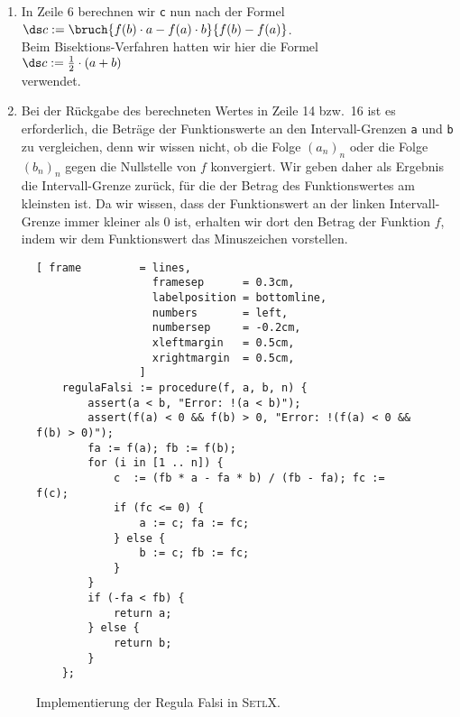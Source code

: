 \begin{enumerate}
\item In Zeile 6 berechnen wir \texttt{c} nun nach der Formel
      \\[0.2cm]
      \hspace*{1.3cm}
      $\ds c := \bruch{f(b) \cdot a - f(a) \cdot b}{f(b) - f(a)}$. 
      \\[0.2cm]
      Beim Bisektions-Verfahren hatten wir hier die Formel
      \\[0.2cm]
      \hspace*{1.3cm}
      $\ds c := \frac{1}{2} \cdot (a + b)$
      \\[0.2cm]
      verwendet.
\item Bei der R\"uckgabe des berechneten Wertes in Zeile 14 bzw.~16 ist es erforderlich, die Betr\"age der
      Funktionswerte an den Intervall-Grenzen  \texttt{a} und \texttt{b} zu vergleichen, denn wir
      wissen nicht, ob die Folge $(a_n)_n$ oder die Folge $(b_n)_n$ gegen die Nullstelle von $f$
      konvergiert.  Wir geben daher als Ergebnis die 
      Intervall-Grenze  zur\"uck, f\"ur die der Betrag des Funktionswertes am kleinsten ist.
      Da wir wissen, dass der Funktionswert an der linken Intervall-Grenze immer kleiner als 0
      ist, erhalten wir dort den Betrag der Funktion $f$, indem wir dem Funktionswert das Minuszeichen
      vorstellen. 
\end{enumerate}

\begin{figure}[!ht]
  \centering
\begin{Verbatim}[ frame         = lines, 
                  framesep      = 0.3cm, 
                  labelposition = bottomline,
                  numbers       = left,
                  numbersep     = -0.2cm,
                  xleftmargin   = 0.5cm,
                  xrightmargin  = 0.5cm,
                ]
    regulaFalsi := procedure(f, a, b, n) {
        assert(a < b, "Error: !(a < b)");
        assert(f(a) < 0 && f(b) > 0, "Error: !(f(a) < 0 && f(b) > 0)");
        fa := f(a); fb := f(b); 
        for (i in [1 .. n]) {
            c  := (fb * a - fa * b) / (fb - fa); fc := f(c); 
            if (fc <= 0) {
                a := c; fa := fc; 
            } else {
                b := c; fb := fc; 
            }
        }
        if (-fa < fb) {
            return a;
        } else {
            return b;
        }
    };
\end{Verbatim}
\vspace*{-0.3cm}
  \caption{Implementierung der Regula Falsi in \textsc{SetlX}.}
  \label{fig:regulaFalsi.stlx}
\end{figure} %

